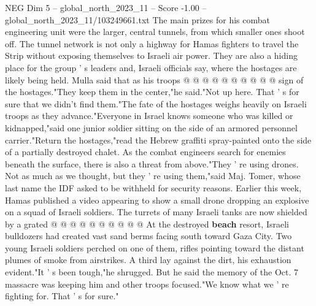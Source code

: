 \begin{textsample}{NEG Dim 5 – global\_north\_2023\_11 – Score -1.00 – global\_north\_2023\_11/103249661.txt}
The main prizes for his combat engineering unit were the larger, central tunnels, from which smaller ones shoot off.
The tunnel network is not only a highway for Hamas fighters to travel the Strip without exposing themselves to Israeli air power.
They are also a hiding place for the group ' s leaders and, Israeli officials say, where the hostages are likely being held.
Mulla said that as his troops @ @ @ @ @ @ @ @ @ @ sign of the hostages."They keep them in the center,"he said."Not up here.
That ' s for sure that we didn't find them."The fate of the hostages weighs heavily on Israeli troops as they advance."Everyone in Israel knows someone who was killed or kidnapped,"said one junior soldier sitting on the side of an armored personnel carrier."Return the hostages,"read the Hebrew graffiti spray-painted onto the side of a partially destroyed chalet.
As the combat engineers search for enemies beneath the surface, there is also a threat from above."They ' re using drones.
Not as much as we thought, but they ' re using them,"said Maj.
Tomer, whose last name the IDF asked to be withheld for security reasons.
Earlier this week, Hamas published a video appearing to show a small drone dropping an explosive on a squad of Israeli soldiers.
The turrets of many Israeli tanks are now shielded by a grated @ @ @ @ @ @ @ @ @ @ At the destroyed \textbf{beach} resort, Israeli bulldozers had created vast sand berms facing south toward Gaza City.
Two young Israeli soldiers perched on one of them, rifles pointing toward the distant plumes of smoke from airstrikes.
A third lay against the dirt, his exhaustion evident."It ' s been tough,"he shrugged.
But he said the memory of the Oct. 7 massacre was keeping him and other troops focused."We know what we ' re fighting for.
That ' s for sure."

\end{textsample}
